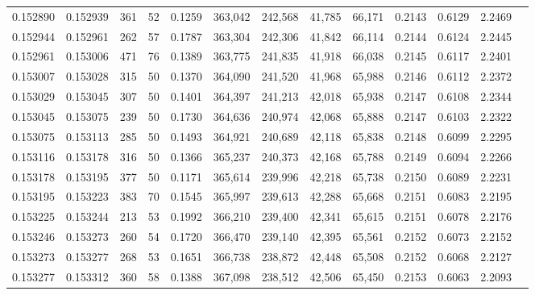 \begin{tabular}{rrrrrrrrrrrrr}
0.152890 & 0.152939 &   361 &  52 &                                     0.1259 & 363,042 & 242,568 &  41,785 &  66,171 & 0.2143 & 0.6129 & 2.2469 \\
0.152944 & 0.152961 &   262 &  57 &                                     0.1787 & 363,304 & 242,306 &  41,842 &  66,114 & 0.2144 & 0.6124 & 2.2445 \\
0.152961 & 0.153006 &   471 &  76 &                                     0.1389 & 363,775 & 241,835 &  41,918 &  66,038 & 0.2145 & 0.6117 & 2.2401 \\
0.153007 & 0.153028 &   315 &  50 &                                     0.1370 & 364,090 & 241,520 &  41,968 &  65,988 & 0.2146 & 0.6112 & 2.2372 \\
0.153029 & 0.153045 &   307 &  50 &                                     0.1401 & 364,397 & 241,213 &  42,018 &  65,938 & 0.2147 & 0.6108 & 2.2344 \\
0.153045 & 0.153075 &   239 &  50 &                                     0.1730 & 364,636 & 240,974 &  42,068 &  65,888 & 0.2147 & 0.6103 & 2.2322 \\
0.153075 & 0.153113 &   285 &  50 &                                     0.1493 & 364,921 & 240,689 &  42,118 &  65,838 & 0.2148 & 0.6099 & 2.2295 \\
0.153116 & 0.153178 &   316 &  50 &                                     0.1366 & 365,237 & 240,373 &  42,168 &  65,788 & 0.2149 & 0.6094 & 2.2266 \\
0.153178 & 0.153195 &   377 &  50 &                                     0.1171 & 365,614 & 239,996 &  42,218 &  65,738 & 0.2150 & 0.6089 & 2.2231 \\
0.153195 & 0.153223 &   383 &  70 &                                     0.1545 & 365,997 & 239,613 &  42,288 &  65,668 & 0.2151 & 0.6083 & 2.2195 \\
0.153225 & 0.153244 &   213 &  53 &                                     0.1992 & 366,210 & 239,400 &  42,341 &  65,615 & 0.2151 & 0.6078 & 2.2176 \\
0.153246 & 0.153273 &   260 &  54 &                                     0.1720 & 366,470 & 239,140 &  42,395 &  65,561 & 0.2152 & 0.6073 & 2.2152 \\
0.153273 & 0.153277 &   268 &  53 &                                     0.1651 & 366,738 & 238,872 &  42,448 &  65,508 & 0.2152 & 0.6068 & 2.2127 \\
0.153277 & 0.153312 &   360 &  58 &                                     0.1388 & 367,098 & 238,512 &  42,506 &  65,450 & 0.2153 & 0.6063 & 2.2093 \\

\end{tabular}
